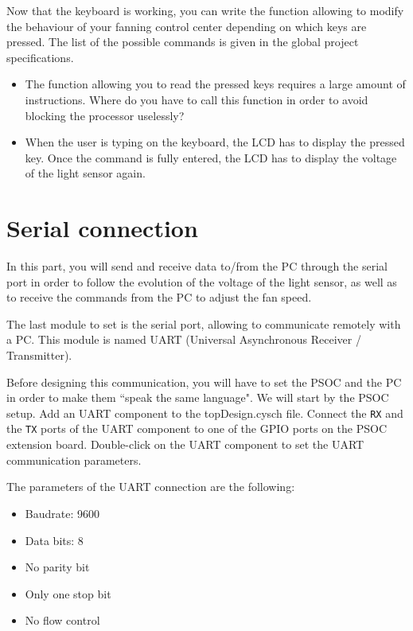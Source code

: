 \documentclass[11pt,a4paper]{article}
\theoremstyle{definition}%
\begin{document}
Now that the keyboard is working, you can write the function allowing to modify the behaviour of your fanning control center depending on which keys are pressed.
The list of the possible commands is given in the global project specifications.
\begin{itemize}
	\item The function allowing you to read the pressed keys requires a large amount of instructions.
	Where do you have to call this function in order to avoid blocking the processor uselessly?
	\item When the user is typing on the keyboard, the LCD has to display the pressed key.
	Once the command is fully entered, the LCD has to display the voltage of the light sensor again.
\end{itemize}









\section{Serial connection}
In this part, you will send and receive data to/from the PC through the serial port in order to follow the evolution of the voltage of the light sensor, as well as to receive the commands from the PC to adjust the fan speed.

The last module to set is the serial port, allowing to communicate remotely with a PC.
This module is named UART (Universal Asynchronous Receiver / Transmitter).

Before designing this communication, you will have to set the PSOC and the PC in order to make them ``speak the same language".
We will start by the PSOC setup. Add an UART component to the topDesign.cysch file. Connect the \texttt{RX} and the \texttt{TX} ports of the UART component to one of the GPIO ports on the PSOC extension board. Double-click on the UART component to set the UART communication parameters.

The parameters of the UART connection are the following: 
\begin{itemize}
	\item Baudrate: 9600
	\item Data bits: 8
	\item No parity bit
	\item Only one stop bit
	\item No flow control
\end{itemize}
\end{document}

